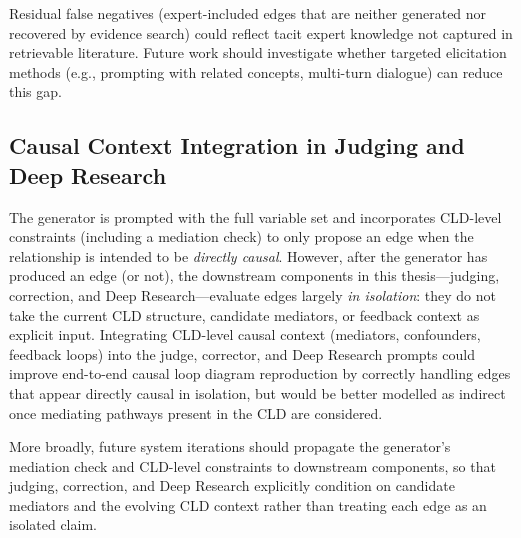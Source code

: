 Residual false negatives (expert-included edges that are neither generated nor recovered by evidence search) could reflect tacit expert knowledge not captured in retrievable literature. Future work should investigate whether targeted elicitation methods (e.g., prompting with related concepts, multi-turn dialogue) can reduce this gap.

\subsection{Causal Context Integration in Judging and Deep Research}

The generator is prompted with the full variable set and incorporates CLD-level constraints (including a mediation check) to only propose an edge when the relationship is intended to be \textit{directly causal}. However, after the generator has produced an edge (or not), the downstream components in this thesis---judging, correction, and Deep Research---evaluate edges largely \textit{in isolation}: they do not take the current CLD structure, candidate mediators, or feedback context as explicit input. Integrating CLD-level causal context (mediators, confounders, feedback loops) into the judge, corrector, and Deep Research prompts could improve end-to-end causal loop diagram reproduction by correctly handling edges that appear directly causal in isolation, but would be better modelled as indirect once mediating pathways present in the CLD are considered.

More broadly, future system iterations should propagate the generator's mediation check and CLD-level constraints to downstream components, so that judging, correction, and Deep Research explicitly condition on candidate mediators and the evolving CLD context rather than treating each edge as an isolated claim.